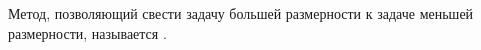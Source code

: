 \begin{Proof}







\end{Proof}

Метод, позволяющий свести задачу большей размерности к задаче меньшей размерности, называется .
